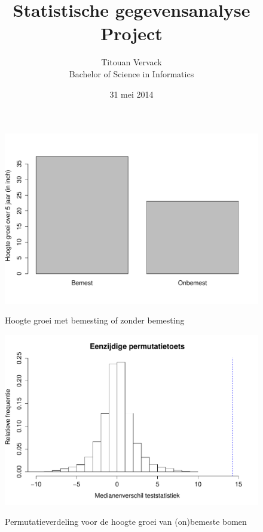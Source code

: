 \documentclass[11pt, a4paper]{article}
\begin{document}
\title{Statistische gegevensanalyse \\ Project}
\author{Titouan Vervack\\ Bachelor of Science in Informatics}
\date{31 mei 2014}
\maketitle
\newpage
\begin{figure}
	\begin{center}
		\includegraphics[scale=0.45]{barplot_a.pdf}
		\caption{Hoogte groei met bemesting of zonder bemesting}
		\label{bara}
		\includegraphics[scale=0.45]{perm_a.pdf}
		\caption{Permutatieverdeling voor de hoogte groei van (on)bemeste bomen}
		\label{perma}
		\vspace{0.5cm}
	\end{center}
\end{figure}
\end{document}
